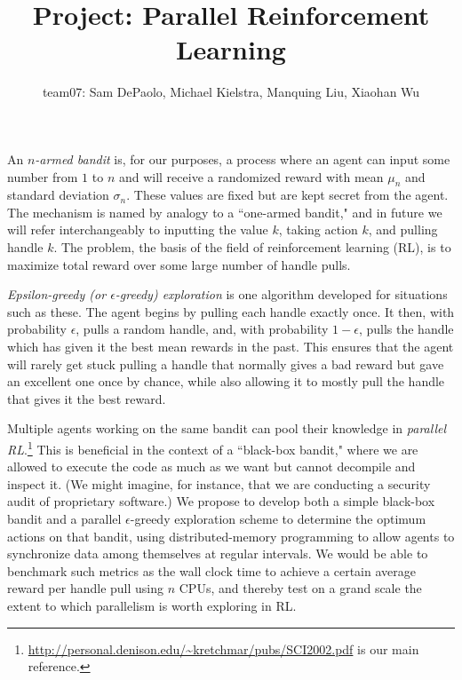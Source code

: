 \documentclass[]{article}
\title{Project: Parallel Reinforcement Learning}
\author{team07: Sam DePaolo, Michael Kielstra, Manquing Liu, Xiaohan Wu}
\begin{document}
\maketitle

An \textit{$n$-armed bandit} is, for our purposes, a process where an agent can input some number from $1$ to $n$ and will receive a randomized reward with mean $\mu_n$ and standard deviation $\sigma_n$.  These values are fixed but are kept secret from the agent.  The mechanism is named by analogy to a ``one-armed bandit," and in future we will refer interchangeably to inputting the value $k$, taking action $k$, and pulling handle $k$.  The problem, the basis of the field of reinforcement learning (RL), is to maximize total reward over some large number of handle pulls.

\textit{Epsilon-greedy (or $\epsilon$-greedy) exploration} is one algorithm developed for situations such as these.  The agent begins by pulling each handle exactly once.  It then, with probability $\epsilon$, pulls a random handle, and, with probability $1 - \epsilon$, pulls the handle which has given it the best mean rewards in the past.  This ensures that the agent will rarely get stuck pulling a handle that normally gives a bad reward but gave an excellent one once by chance, while also allowing it to mostly pull the handle that gives it the best reward.

Multiple agents working on the same bandit can pool their knowledge in \textit{parallel RL}.\footnote{\url{http://personal.denison.edu/~kretchmar/pubs/SCI2002.pdf} is our main reference.}  This is beneficial in the context of a ``black-box bandit," where we are allowed to execute the code as much as we want but cannot decompile and inspect it.  (We might imagine, for instance, that we are conducting a security audit of proprietary software.)  We propose to develop both a simple black-box bandit and a parallel $\epsilon$-greedy exploration scheme to determine the optimum actions on that bandit, using distributed-memory programming to allow agents to synchronize data among themselves at regular intervals.  We would be able to benchmark such metrics as the wall clock time to achieve a certain average reward per handle pull using $n$ CPUs, and thereby test on a grand scale the extent to which parallelism is worth exploring in RL.
\end{document}
